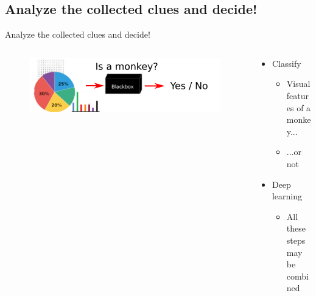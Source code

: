\documentclass{beamer}[10pt, usepdftitle=false, handout]
\begin{document}
 \subsection{Analyze the collected clues and decide!}
    \begin{frame}

	Analyze the collected clues and decide!
	\vspace*{1.0em}	
	
\begin{columns}
\begin{column}{0.5\textwidth}
	\begin{figure}
		\includegraphics[scale=0.15]{monkey-8.png} 
	\end{figure}	 
\end{column}
\begin{column}{0.5\textwidth}  %
    \begin{center}
	\begin{itemize}
	\item{Classify
		\begin{itemize}
			\item{Visual features of a monkey...}
			\item{...or not\newline}
			
		\end{itemize}			
	}

	\item{Deep learning
		\begin{itemize}
		\item{All these steps may be combined}
		\end{itemize}			
	}
	\end{itemize}	     
     
     \end{center}
	\end{column}
	\end{columns}	
				
    \end{frame}		
		
\end{document}
